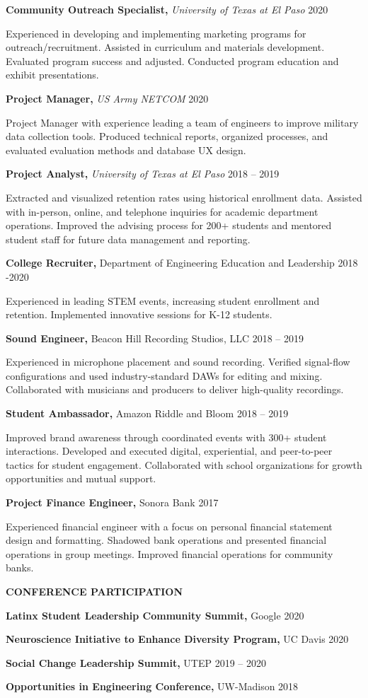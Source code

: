 \documentclass[
]{article}
\begin{document}
\textbf{Community Outreach Specialist,} \emph{University of Texas at El Paso} 2020

Experienced in developing and implementing marketing programs for outreach/recruitment. Assisted in curriculum and materials development. Evaluated program success and adjusted. Conducted program education and exhibit presentations.

\textbf{Project Manager,} \emph{US Army NETCOM} 2020

Project Manager with experience leading a team of engineers to improve military data collection tools. Produced technical reports, organized processes, and evaluated evaluation methods and database UX design.

\textbf{Project Analyst,} \emph{University of Texas at El Paso} 2018 -- 2019

Extracted and visualized retention rates using historical enrollment data. Assisted with in-person, online, and telephone inquiries for academic department operations. Improved the advising process for 200+ students and mentored student staff for future data management and reporting.

\textbf{College Recruiter,} Department of Engineering Education and Leadership 2018 -2020

Experienced in leading STEM events, increasing student enrollment and retention. Implemented innovative sessions for K-12 students.

\textbf{Sound Engineer,} Beacon Hill Recording Studios, LLC 2018 -- 2019

Experienced in microphone placement and sound recording. Verified signal-flow configurations and used industry-standard DAWs for editing and mixing. Collaborated with musicians and producers to deliver high-quality recordings.

\textbf{Student Ambassador,} Amazon \textbar{} Riddle and Bloom 2018 -- 2019

Improved brand awareness through coordinated events with 300+ student interactions. Developed and executed digital, experiential, and peer-to-peer tactics for student engagement. Collaborated with school organizations for growth opportunities and mutual support.

\textbf{Project Finance Engineer,} Sonora Bank 2017

Experienced financial engineer with a focus on personal financial statement design and formatting. Shadowed bank operations and presented financial operations in group meetings. Improved financial operations for community banks.

\textbf{CONFERENCE PARTICIPATION}

\textbf{Latinx Student Leadership Community Summit,} Google 2020

\textbf{Neuroscience Initiative to Enhance Diversity Program,} UC Davis 2020

\textbf{Social Change Leadership Summit,} UTEP 2019 -- 2020

\textbf{Opportunities in Engineering Conference,} UW-Madison 2018
\end{document}
